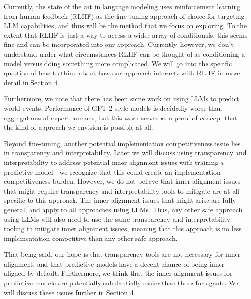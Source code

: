 {Currently, the state of the art in language modeling uses reinforcement learning from human feedback (RLHF) as the fine-tuning approach of choice for targeting LLM capabilities, and thus will be the method that we focus on exploring. To the extent that RLHF is just a way to access a wider array of conditionals\cite{TODO: cite https://www.alignmentforum.org/posts/chevXfQmRYrTZnj8r/conditioning-prompts-and-fine-tuning}, this seems fine and can be incorporated into our approach. Currently, however, we don't understand under what circumstances RLHF can be thought of as conditioning a model versus doing something more complicated. We will go into the specific question of how to think about how our approach interacts with RLHF in more detail in Section 4\cite{TODO: cite https://www.alignmentforum.org/posts/qoHwKgLFfPcEuwaba/conditioning-predictive-models-making-inner-alignment-as}.

Furthermore, we note that there has been some work\cite{TODO: cite https://arxiv.org/pdf/2206.15474.pdf} on using LLMs to predict world events. Performance of GPT-2-style models is decidedly worse than aggregations of expert humans, but this work serves as a proof of concept that the kind of approach we envision is possible at all.

Beyond fine-tuning, another potential implementation competitiveness issue lies in transparency and interpretability. Later we will discuss using transparency and interpretability to address potential inner alignment issues with training a predictive model---we recognize that this could create an implementation competitiveness burden. However, we do not believe that inner alignment issues that might require transparency and interpretability tools to mitigate are at all specific to this approach. The inner alignment issues that might arise are fully general, and apply to all approaches using LLMs. Thus, any other safe approach using LLMs will also need to use the same transparency and interpretability tooling to mitigate inner alignment issues, meaning that this approach is no less implementation competitive than any other safe approach.

That being said, our hope is that transparency tools are not necessary for inner alignment, and that predictive models have a decent chance of being inner aligned by default. Furthermore, we think that the inner alignment issues for predictive models are potentially substantially easier than those for agents. We will discuss these issues further in Section 4\cite{TODO: cite https://www.alignmentforum.org/posts/qoHwKgLFfPcEuwaba/conditioning-predictive-models-making-inner-alignment-as}.


}
